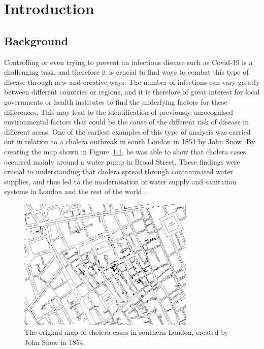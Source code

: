 %
\chapter{Introduction}
\label{sec:intro}
\section{Background}
Controlling or even trying to prevent an infectious disease such as Covid-19 is a challenging task, and therefore it is crucial to find ways to combat this type of disease through new and creative ways. The number of infections can vary greatly between different countries or regions, and it is therefore of great interest for local governments or health institutes to find the underlying factors for these differences. This may lead to the identification of previously unrecognised environmental factors that could be the cause of the different risk of disease in different areas. One of the earliest examples of this type of analysis was carried out in relation to a cholera outbreak in south London in 1854 by John Snow. By creating the map shown in Figure~\ref{cholera}, he was able to show that cholera cases occurred mainly around a water pump in Broad Street. These findings were crucial to understanding that cholera spread through contaminated water supplies, and thus led to the modernisation of water supply and sanitation systems in London and the rest of the world \cite{snow1857cholera}.
\begin{figure}[H]
    \centering
    \includegraphics[width = 0.75\textwidth]{cholera_map.jpg}
    \caption{The original map of cholera cases in southern London, created by John Snow in 1854.}
    \label{cholera}
\end{figure}

